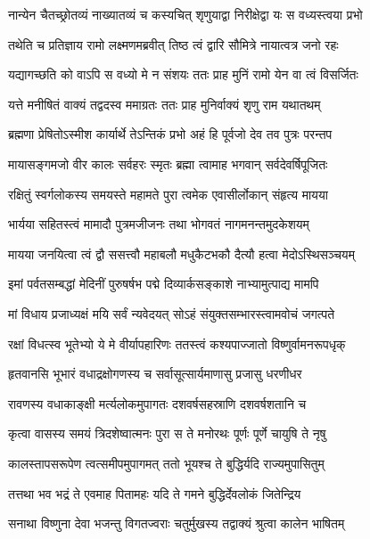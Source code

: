 \twolineshloka
{नान्येन चैतच्छ्रोतव्यं नाख्यातव्यं च कस्यचित्}
{शृणुयाद्वा निरीक्षेद्वा यः स वध्यस्त्वया प्रभो} %

\twolineshloka
{तथेति च प्रतिज्ञाय रामो लक्ष्मणमब्रवीत्}
{तिष्ठ त्वं द्वारि सौमित्रे नायात्वत्र जनो रहः} %

\twolineshloka
{यद्यागच्छति को वाऽपि स वध्यो मे न संशयः}
{ततः प्राह मुनिं रामो येन वा त्वं विसर्जितः} %

\twolineshloka
{यत्ते मनीषितं वाक्यं तद्वदस्व ममाग्रतः}
{ततः प्राह मुनिर्वाक्यं शृणु राम यथातथम्} %

\twolineshloka
{ब्रह्मणा प्रेषितोऽस्मीश कार्यार्थे तेऽन्तिकं प्रभो}
{अहं हि पूर्वजो देव तव पुत्रः परन्तप} %

\twolineshloka
{मायासङ्गमजो वीर कालः सर्वहरः स्मृतः}
{ब्रह्मा त्वामाह भगवान् सर्वदेवर्षिपूजितः} %

\twolineshloka
{रक्षितुं स्वर्गलोकस्य समयस्ते महामते}
{पुरा त्वमेक एवासीर्लोकान् संहृत्य मायया} %

\twolineshloka
{भार्यया सहितस्त्वं मामादौ पुत्रमजीजनः}
{तथा भोगवतं नागमनन्तमुदकेशयम्} %

\twolineshloka
{मायया जनयित्वा त्वं द्वौ ससत्त्वौ महाबलौ}
{मधुकैटभकौ दैत्यौ हत्वा मेदोऽस्थिसञ्चयम्} %

\twolineshloka
{इमां पर्वतसम्बद्धां मेदिनीं पुरुषर्षभ}
{पद्मे दिव्यार्कसङ्काशे नाभ्यामुत्पाद्य मामपि} %

\twolineshloka
{मां विधाय प्रजाध्यक्षं मयि सर्वं न्यवेदयत्}
{सोऽहं संयुक्तसम्भारस्त्वामवोचं जगत्पते} %

\twolineshloka
{रक्षां विधत्स्व भूतेभ्यो ये मे वीर्यापहारिणः}
{ततस्त्वं कश्यपाज्जातो विष्णुर्वामनरूपधृक्} %

\twolineshloka
{हृतवानसि भूभारं वधाद्रक्षोगणस्य च}
{सर्वासूत्सार्यमाणासु प्रजासु धरणीधर} %

\twolineshloka
{रावणस्य वधाकाङ्क्षी मर्त्यलोकमुपागतः}
{दशवर्षसहस्राणि दशवर्षशतानि च} %

\twolineshloka
{कृत्वा वासस्य समयं त्रिदशेष्वात्मनः पुरा}
{स ते मनोरथः पूर्णः पूर्णे चायुषि ते नृषु} %

\twolineshloka
{कालस्तापसरूपेण त्वत्समीपमुपागमत्}
{ततो भूयश्च ते बुद्धिर्यदि राज्यमुपासितुम्} %

\twolineshloka
{तत्तथा भव भद्रं ते एवमाह पितामहः}
{यदि ते गमने बुद्धिर्देवलोकं जितेन्द्रिय} %

\twolineshloka
{सनाथा विष्णुना देवा भजन्तु विगतज्वराः}
{चतुर्मुखस्य तद्वाक्यं श्रुत्वा कालेन भाषितम्} %

